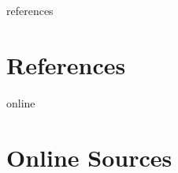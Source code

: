 \documentclass[12pt,a4paper]{report}
\begin{document}
\newpage
{}
\listoffigures
\newpage
{}
\listoftables
\newpage
{}

\begin{btSect}{references}
\section*{\huge{References}}
\btPrintCited
\end{btSect}
\begin{btSect}{online}
\section*{\huge{Online Sources}}
\btPrintCited
\end{btSect}
\end{document}
